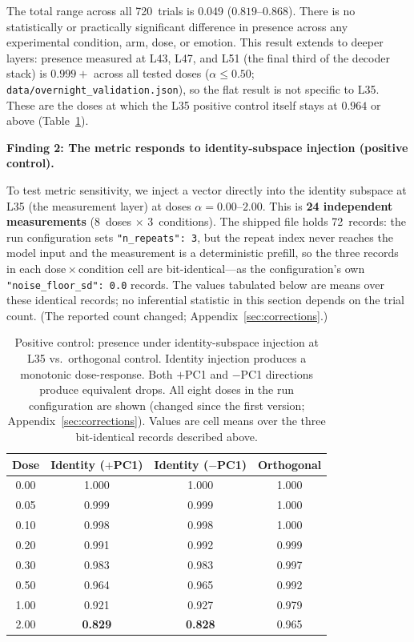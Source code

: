 \documentclass[11pt,a4paper]{article}
\begin{document}
The total range across all 720~trials is 0.049 ($0.819$--$0.868$).
There is no statistically or practically significant difference in
presence across any experimental condition, arm, dose, or emotion.
This result extends to deeper layers: presence measured at L43, L47,
and L51 (the final third of the decoder stack) is $0.999{+}$ across
all tested doses ($\alpha \le 0.50$; \nolinkurl{data/overnight_validation.json}),
so the flat result is not specific to L35. These are the doses at which
the L35 positive control itself stays at $0.964$ or above
(Table~\ref{tab:positive_control}).

\textbf{Finding 2: The metric responds to identity-subspace injection
(positive control).}

To test metric sensitivity, we inject a vector directly into the
identity subspace at L35 (the measurement layer) at doses
$\alpha = 0.00$--$2.00$. This is \textbf{24 independent measurements}
(8~doses $\times$ 3~conditions). The shipped file holds 72~records: the
run configuration sets \texttt{"n\_repeats": 3}, but the repeat index
never reaches the model input and the measurement is a deterministic
prefill, so the three records in each dose\,$\times$\,condition cell are
bit-identical---as the configuration's own \texttt{"noise\_floor\_sd": 0.0}
records. The values tabulated below are means over these identical
records; no inferential statistic in this section depends on the trial
count. (The reported count changed; Appendix~\ref{sec:corrections}.)

\begin{table}[H]
\centering
\caption{Positive control: presence under identity-subspace injection at
L35 vs.\ orthogonal control. Identity injection produces a monotonic
dose-response. Both $+$PC1 and $-$PC1 directions produce equivalent drops.
All eight doses in the run configuration are shown (changed since the
first version; Appendix~\ref{sec:corrections}). Values are cell means
over the three bit-identical records described above.}
\label{tab:positive_control}
\begin{tabular}{cccc}
\toprule
Dose & Identity ($+$PC1) & Identity ($-$PC1) & Orthogonal \\
\midrule
0.00 & 1.000 & 1.000 & 1.000 \\
0.05 & 0.999 & 0.999 & 1.000 \\
0.10 & 0.998 & 0.998 & 1.000 \\
0.20 & 0.991 & 0.992 & 0.999 \\
0.30 & 0.983 & 0.983 & 0.997 \\
0.50 & 0.964 & 0.965 & 0.992 \\
1.00 & 0.921 & 0.927 & 0.979 \\
2.00 & \textbf{0.829} & \textbf{0.828} & 0.965 \\
\bottomrule
\end{tabular}
\end{table}
\end{document}
